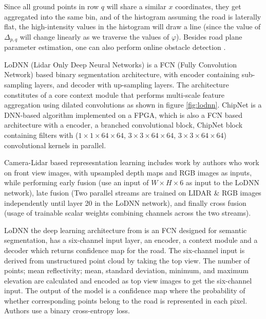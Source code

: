 \documentclass[10pt,twocolumn,letterpaper]{article}
\begin{document}
Since all ground points in row $q$ will share a similar $x$ coordinates, they get aggregated into the same bin, and of the histogram assuming the road is laterally flat, the 
high-intensity values in the histogram will draw a line (since the value of 
$\Delta_{p,q}$ will change linearly as we traverse the values of $\varphi$). 
Besides road plane parameter estimation, one can also perform 
online obstacle detection \cite{ravi2018real}.

LoDNN (Lidar Only Deep Neural Networks) \cite{lodnn2017} is a FCN (Fully Convolution Network) based binary segmentation architecture, with encoder containing sub-sampling layers, and decoder with up-sampling layers. The architecture constitutes of a core context module that performs multi-scale feature aggregation using dilated convolutions as shown in figure \ref{fig:lodnn}. ChipNet \cite{lyu2018chipnet} is a DNN-based algorithm
implemented on a FPGA, which is also a FCN based architecture with a encoder, a branched convolutional block, ChipNet block containing filters with ($1 \times 1 \times 64 \times 64$, $3 \times 3 \times 64 \times 64$, $3 \times 3 \times 64 \times 64$) convolutional kernels in parallel.

Camera-Lidar based represesntation learning includes work by authors \cite{lidarcamnet2019} who work on front view images, with upsampled depth maps and RGB images as inputs, while performing early fusion (use an input of $W \times H \times 6$ as input to the LoDNN network), late fusion (Two parallel streams are trained on LIDAR \& RGB images independently until layer 20 in the LoDNN network), and finally cross fusion (usage of trainable scalar weights combining channels across the two streams).

LoDNN the deep learning architecture from \cite{lodnn2017} is an FCN designed for semantic segmentation, has a six-channel input layer, an encoder, a context module and a decoder which returns confidence map for the road. The six-channel input is derived from unstructured point cloud by taking the top view. The number of points; mean reflectivity; mean, standard deviation, minimum, and maximum elevation are calculated and encoded as top view images to get the six-channel input. The output of the model is a confidence map where the probability of whether corresponding points belong to the road is represented in each pixel. Authors use a binary cross-entropy loss. 
\end{document}
